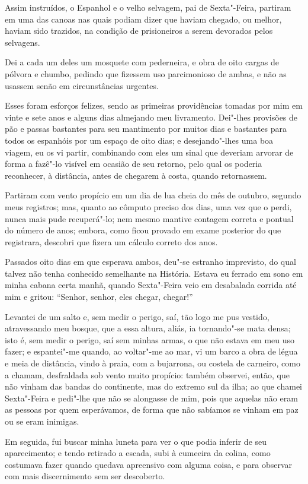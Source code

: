 Assim instruídos, o Espanhol e o velho selvagem, pai de Sexta"-Feira,
partiram em uma das canoas nas quais podiam dizer que haviam chegado, ou
melhor, haviam sido trazidos, na condição de prisioneiros a serem
devorados pelos selvagens.

Dei a cada um deles um mosquete com pederneira, e obra de oito cargas de
pólvora e chumbo, pedindo que fizessem uso parcimonioso de ambas, e não
as usassem senão em circunstâncias urgentes.

Esses foram esforços felizes, sendo as primeiras providências tomadas
por mim em vinte e sete anos e alguns dias almejando meu livramento.
Dei"-lhes provisões de pão e passas bastantes para seu mantimento por
muitos dias e bastantes para todos os espanhóis por um espaço de oito
dias; e desejando"-lhes uma boa viagem, eu os vi partir, combinando com
eles um sinal que deveriam arvorar de forma a fazê"-lo visível em ocasião
de seu retorno, pelo qual os poderia reconhecer, à distância, antes de
chegarem à costa, quando retornassem.

Partiram com vento propício em um dia de lua cheia do mês de outubro,
segundo meus registros; mas, quanto ao cômputo preciso dos dias, uma vez
que o perdi, nunca mais pude recuperá"-lo; nem mesmo mantive contagem
correta e pontual do número de anos; embora, como ficou provado em exame
posterior do que registrara, descobri que fizera um cálculo correto dos
anos.

Passados oito dias em que esperava ambos, deu"-se estranho imprevisto, do
qual talvez não tenha conhecido semelhante na História. Estava eu
ferrado em sono em minha cabana certa manhã, quando Sexta"-Feira veio em
desabalada corrida até mim e gritou: ``Senhor, senhor, eles chegar,
chegar!''

Levantei de um salto e, sem medir o perigo, saí, tão logo me pus
vestido, atravessando meu bosque, que a essa altura, aliás, ia
tornando"-se mata densa; isto é, sem medir o perigo, saí sem minhas
armas, o que não estava em meu uso fazer; e espantei"-me quando, ao
voltar"-me ao mar, vi um barco a obra de légua e meia de distância, vindo
à praia, com a bujarrona, ou costela de carneiro, como a chamam,
desfraldada sob vento muito propício: também observei, então, que não
vinham das bandas do continente, mas do extremo sul da ilha; ao que
chamei Sexta"-Feira e pedi"-lhe que não se alongasse de mim, pois que
aquelas não eram as pessoas por quem esperávamos, de forma que não
sabíamos se vinham em paz ou se eram inimigas.

Em seguida, fui buscar minha luneta para ver o que podia inferir de seu
aparecimento; e tendo retirado a escada, subi à cumeeira da colina, como
costumava fazer quando quedava apreensivo com alguma coisa, e para
observar com mais discernimento sem ser descoberto.

